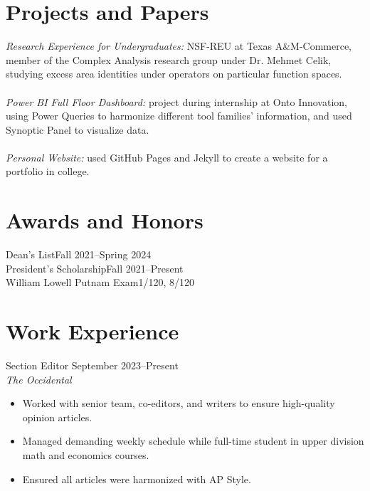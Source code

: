 \documentclass[margin, 12pt]{res} %
\begin{document}
\begin{resume}
\section{\sc Projects and Papers}
{\sl Research Experience for Undergraduates:} NSF-REU at Texas A\&M-Commerce, member of the Complex Analysis research group under Dr. Mehmet Celik, studying excess area identities under operators on particular function spaces.\\
\vspace{4pt}\\
{\sl Power BI Full Floor Dashboard:} project during internship at Onto Innovation, using Power Queries to harmonize different tool families' information, and used Synoptic Panel to visualize data.\\
\vspace{4pt}\\
{\sl Personal Website:} used GitHub Pages and Jekyll to create a website for a portfolio in college.\\

\section{\sc Awards and Honors}
Dean's List\hfill Fall 2021--Spring 2024\\
President's Scholarship\hfill Fall 2021--Present\\
William Lowell Putnam Exam\hfill 1/120, 8/120

\section{\sc Work Experience}


Section Editor \hfill September 2023--Present \\
\textit{The Occidental}
\begin{itemize}\itemsep -2pt
  \item Worked with senior team, co-editors, and writers to ensure high-quality opinion articles.
  \item Managed demanding weekly schedule while full-time student in upper division math and economics courses.
  \item Ensured all articles were harmonized with AP Style.
\end{itemize}


\end{resume}
\end{document}
